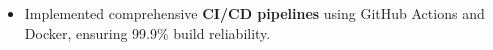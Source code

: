 \documentclass[11pt,letterpaper]{article}
\begin{document}
\begin{infocard}
\begin{itemize}[itemsep=2pt, parsep=1pt, leftmargin=1em]
                    Mentored 4 junior and mid-level engineers through code reviews, architecture workshops, and pair programming, fostering a culture of continuous learning.
                
                
                
            
                \item
                
                    Implemented comprehensive \textbf{CI/CD pipelines} using GitHub Actions and Docker, ensuring 99.9\% build reliability.
                
                
                
            
            \end{itemize}
        
        \end{infocard}
        \vspace{6pt}
    
\end{document}
